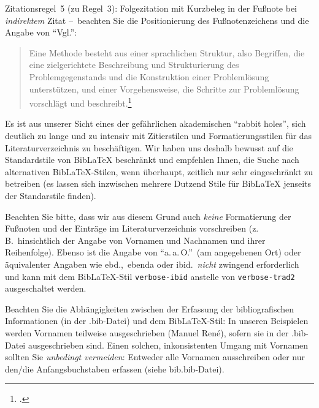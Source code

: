 


Zitationsregel~5 (zu Regel~3): Folgezitation mit Kurzbeleg in der Fußnote bei \emph{indirektem} Zitat --~beachten Sie die Positionierung des Fußnotenzeichens  und die Angabe von \enquote{Vgl.}:

\begin{quote}
Eine Methode besteht aus einer sprachlichen Struktur, also Begriffen, die eine zielgerichtete Beschreibung und Strukturierung des Problemgegenstands und die Konstruktion einer Problemlösung unterstützen, und einer Vorgehensweise, die Schritte zur Problemlösung vorschlägt und beschreibt.\footcite[Vgl.][S.~161f.]{Fran07Konfig}
\end{quote}


Es ist aus unserer Sicht eines der gefährlichen akademischen \enquote{rabbit holes}, sich deutlich zu lange und zu intensiv mit Zitierstilen und Formatierungsstilen für das Literaturverzeichnis zu beschäftigen. Wir haben uns deshalb bewusst auf die Standardstile von BibLaTeX beschränkt und empfehlen Ihnen, die Suche nach alternativen BibLaTeX-Stilen, wenn überhaupt, zeitlich nur sehr eingeschränkt zu betreiben (es lassen sich inzwischen mehrere Dutzend Stile für BibLaTeX jenseits der Standarstile finden). 

\begin{shaded}
Beachten Sie bitte, dass wir aus diesem Grund auch \emph{keine} Formatierung der Fußnoten und der Einträge im Literaturverzeichnis vorschreiben (z.\,B.\ hinsichtlich der Angabe von Vornamen und Nachnamen und ihrer Reihenfolge).
%
Ebenso ist die Angabe von \enquote{a.\,a.\,O.}\ (am angegebenen Ort) oder äquivalenter Angaben wie ebd.,\ ebenda oder ibid.\ \emph{nicht} zwingend erforderlich und kann mit dem BibLaTeX-Stil \verb|verbose-ibid| anstelle von \verb|verbose-trad2| ausgeschaltet werden.
%
\end{shaded}


Beachten Sie die Abhängigkeiten zwischen der Erfassung der bibliografischen Informationen (in der .bib-Datei) und dem BibLaTeX-Stil: In unseren Beispielen werden Vornamen teilweise ausgeschrieben (Manuel René), sofern sie in der .bib-Datei ausgeschrieben sind. Einen solchen, inkonsistenten Umgang mit Vornamen sollten Sie \emph{unbedingt vermeiden}: Entweder alle Vornamen ausschreiben oder nur den/die Anfangsbuchstaben erfassen (siehe bib.bib-Datei). 


